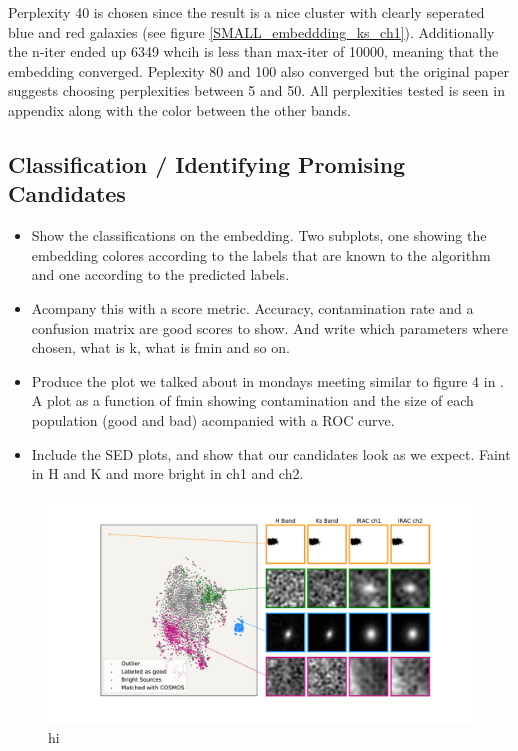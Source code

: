Perplexity 40 is chosen since the result is a nice cluster with clearly seperated blue and red galaxies (see figure \ref{SMALL_embeddding_ks_ch1}). Additionally the n-iter ended up 6349 whcih is less than max-iter of 10000, meaning that the embedding converged. Peplexity 80 and 100 also converged but the original paper \cite{Maaten_2008_tSNE} suggests choosing perplexities between 5 and 50. All perplexities tested is seen in appendix along with the color between the other bands.

\subsection{Classification / Identifying Promising Candidates}
\begin{itemize}
    \item Show the classifications on the embedding. Two subplots, one showing the embedding colores according to the labels that are known to the algorithm and one according to the predicted labels.
    \item Acompany this with a score metric. Accuracy, contamination rate and a confusion matrix are good scores to show. And write which parameters where chosen, what is k, what is fmin and so on.
    \item Produce the plot we talked about in mondays meeting similar to figure 4 in \cite{Steinhardt_2020}. A plot as a function of fmin showing contamination and the size of each population (good and bad) acompanied with a ROC curve.
    \item Include the SED plots, and show that our candidates look as we expect. Faint in H and K and more bright in ch1 and ch2.
\end{itemize}

\begin{figure}[h!]
    \centering %
    \includegraphics[trim={0cm 0cm 0cm 0cm},clip,width=\textwidth]{Code/Saved_Figures/Visual_inspection_embedding.pdf}
    \caption{hi}
    \label{embedding_regions}
\end{figure}